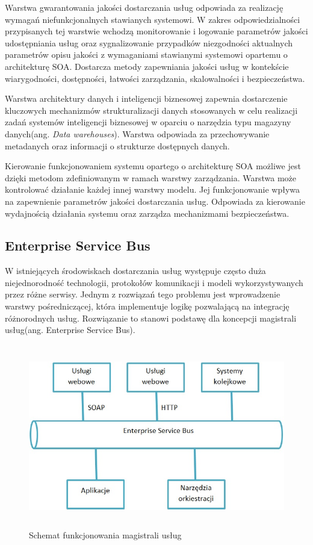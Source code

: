 			Warstwa gwarantowania jakości dostarczania usług odpowiada za realizację wymagań niefunkcjonalnych stawianych systemowi. W zakres odpowiedzialności przypisanych tej warstwie wchodzą monitorowanie i logowanie parametrów jakości udostępniania usług oraz sygnalizowanie przypadków niezgodności aktualnych parametrów opisu jakości z wymaganiami stawianymi systemowi opartemu o architekturę SOA. Dostarcza metody zapewniania jakości usług w kontekście wiarygodności, dostępności, łatwości zarządzania, skalowalności i bezpieczeństwa. 

			Warstwa architektury danych i inteligencji biznesowej zapewnia dostarczenie kluczowych mechanizmów strukturalizacji danych stosowanych w celu realizacji zadań systemów inteligencji biznesowej w oparciu o narzędzia typu magazyny danych(ang. \textit{Data warehouses}). Warstwa odpowiada za przechowywanie metadanych oraz informacji o strukturze dostępnych danych. 

			Kierowanie funkcjonowaniem systemu opartego o architekturę SOA możliwe jest dzięki metodom zdefiniowanym w ramach warstwy zarządzania. Warstwa może kontrolować działanie każdej innej warstwy modelu. Jej funkcjonowanie wpływa na zapewnienie parametrów jakości dostarczania usług. Odpowiada za kierowanie wydajnością działania systemu oraz zarządza mechanizmami bezpieczeństwa. 

	\subsection{Enterprise Service Bus} 

		W istniejących środowiskach dostarczania usług występuje często duża niejednorodność technologii, protokołów komunikacji i modeli wykorzystywanych przez różne serwisy. Jednym z rozwiązań tego problemu jest wprowadzenie warstwy pośredniczącej, która implementuje logikę pozwalającą na integrację różnorodnych usług. Rozwiązanie to stanowi podstawę dla koncepcji magistrali usług(ang. Enterprise Service Bus). 

		\begin{figure}[h]
			\centering
			\includegraphics[width=15cm,height=8cm]{img/esb.jpg}
			\caption{Schemat funkcjonowania magistrali usług}
			\label{Schemat funkcjonowania magistrali uslug}
		\end{figure}

